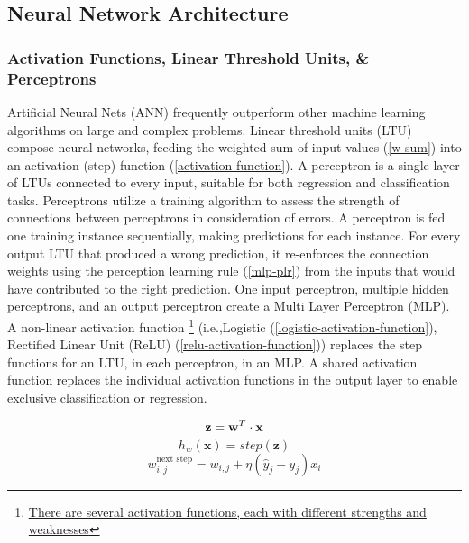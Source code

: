 \documentclass[12pt]{article}
\begin{document}
\subsection{Neural Network Architecture} \label{nn-architecture}
\subsubsection{Activation Functions, Linear Threshold Units, \& Perceptrons}\label{mlp-math}
Artificial Neural Nets (ANN) frequently outperform other machine learning algorithms on large and complex problems.
Linear threshold units (LTU) compose neural networks, feeding the weighted sum of input values (\ref{w-sum}) into an activation (step) function (\ref{activation-function}).
A perceptron is a single layer of LTUs connected to every input, suitable for both regression and classification tasks.
Perceptrons utilize a training algorithm to assess the strength of connections between perceptrons in consideration of errors.
A perceptron is fed one training instance sequentially, making predictions for each instance.
For every output LTU that produced a wrong prediction, it re-enforces the connection weights using the perception learning rule (\ref{mlp-plr}) from the inputs that would have contributed to the right prediction.
One input perceptron, multiple hidden perceptrons, and an output perceptron create a Multi Layer Perceptron (MLP).
A non-linear activation function \footnote{\href{https://towardsdatascience.com/7-popular-activation-functions-you-should-know-in-deep-learning-and-how-to-use-them-with-keras-and-27b4d838dfe6}{There are several activation functions, each with different strengths and weaknesses}} (i.e.,Logistic (\ref{logistic-activation-function}), Rectified Linear Unit (ReLU) (\ref{relu-activation-function})) replaces the step functions for an LTU, in each perceptron, in an MLP.
A shared activation function replaces the individual activation functions in the output layer to enable exclusive classification or regression.
\begin{multicols}{3}
\noindent
    \begin{equation}
        \textbf{z} =\textbf{w}^{T} \cdot \textbf{x}\\
		\label{w-sum}
	\end{equation}
	\begin{equation}
		h_{w}(\textbf{x})=step(\textbf{z})
		\label{activation-function}
	\end{equation}
	\begin{equation}
		w_{i,j}^{\text{next step}} = w_{i,j} + \eta (\hat{y}_j - y_j)x_i 
		\label{mlp-plr}
    \end{equation}
\end{multicols}
\end{document}
